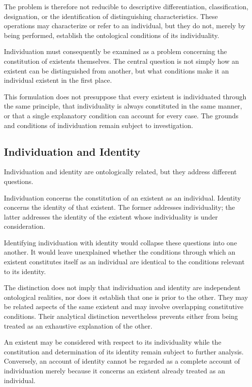 The problem is therefore not reducible to descriptive
differentiation, classification, designation, or the identification
of distinguishing characteristics. These operations may characterize
or refer to an individual, but they do not, merely by being performed,
establish the ontological conditions of its individuality.

Individuation must consequently be examined as a problem concerning
the constitution of existents themselves. The central question is
not simply how an existent can be distinguished from another, but
what conditions make it an individual existent in the first place.

This formulation does not presuppose that every existent is
individuated through the same principle, that individuality is
always constituted in the same manner, or that a single explanatory
condition can account for every case. The grounds and conditions
of individuation remain subject to investigation.

\subsection{Individuation and Identity}

Individuation and identity are ontologically related, but they
address different questions.

Individuation concerns the constitution of an existent as an
individual. Identity concerns the identity of that existent.
The former addresses individuality; the latter addresses the
identity of the existent whose individuality is under consideration.

Identifying individuation with identity would collapse these
questions into one another. It would leave unexplained whether
the conditions through which an existent constitutes itself as
an individual are identical to the conditions relevant to its
identity.

The distinction does not imply that individuation and identity
are independent ontological realities, nor does it establish
that one is prior to the other. They may be related aspects of
the same existent and may involve overlapping constitutive
conditions. Their analytical distinction nevertheless prevents
either from being treated as an exhaustive explanation of the
other.

An existent may be considered with respect to its individuality
while the constitution and determination of its identity remain
subject to further analysis. Conversely, an account of identity
cannot be regarded as a complete account of individuation merely
because it concerns an existent already treated as an individual.

